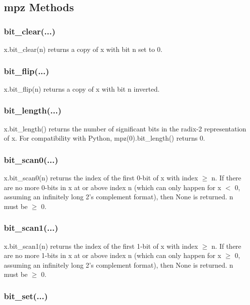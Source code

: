 \subsection{mpz Methods}

\subsubsection{bit\_clear(...)}

x.bit\_clear(n) returns a copy of x with bit n set to 0.

\subsubsection{bit\_flip(...)}

x.bit\_flip(n) returns a copy of x with bit n inverted.

\subsubsection{bit\_length(...)}

x.bit\_length() returns the number of significant bits in the radix-2 representation of x. For compatibility with Python, mpz(0).bit\_length() returns 0.

\subsubsection{bit\_scan0(...)}

x.bit\_scan0(n) returns the index of the first 0-bit of x with index $\ge$ n. If there are no more 0-bits in x at or above index n (which can only happen for x $<$ 0, assuming an infinitely long 2's complement format), then None is returned. n must be $\ge$ 0.

\subsubsection{bit\_scan1(...)}

x.bit\_scan1(n) returns the index of the first 1-bit of x with index $\ge$ n. If there are no more 1-bits in x at or above index n (which can only happen for x $\ge$ 0, assuming an infinitely long 2's complement format), then None is returned. n must be $\ge$ 0.

\subsubsection{bit\_set(...)}

